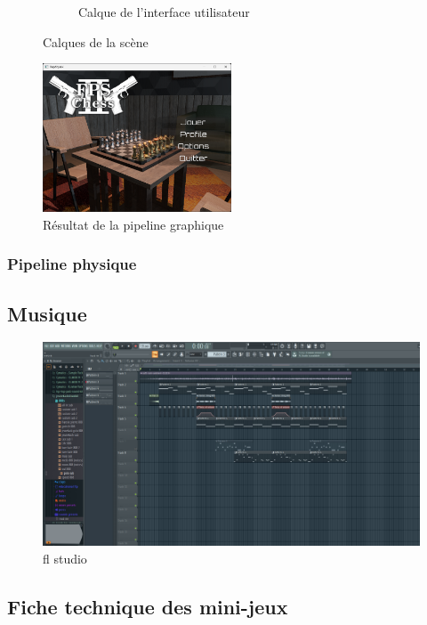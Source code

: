 \begin{figure}[H]
\begin{subfigure}{0.3\textwidth}
            \caption{Calque de l'interface utilisateur}
            \label{fig:graphics_pipeline_gbuffer_gui}
        \end{subfigure}
        \caption{Calques de la scène}
        \label{fig:graphics_pipeline_post_processing}
    \end{figure}
    \begin{figure}[H]
        \centering
        \includegraphics[width=0.5\textwidth]{images/raptiquax_rendering_result.png}
        \caption{Résultat de la pipeline graphique}
        \label{fig:graphics_pipeline_result}
    \end{figure}
    \subsubsection{Pipeline physique}
\subsection{Musique}
\begin{figure}[H]
    \centering
    \includegraphics[width=1\linewidth]{images/flstudio.png}
    \caption{fl studio}
    \label{fig:flstudio.png}
\end{figure}
\subsection{Fiche technique des mini-jeux}

